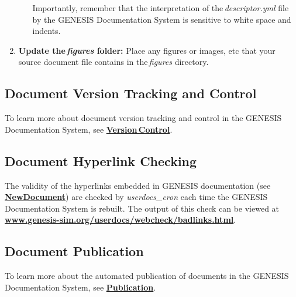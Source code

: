 \documentclass[12pt]{article}
\begin{document}
\begin{enumerate}
\begin{enumerate}
\begin{verbatim}
\end{verbatim}

Importantly, remember that the interpretation of the\,{\it descriptor.yml} file by the GENESIS Documentation System is sensitive to white space and indents.
 
\end{enumerate}

\item {\bf Update the\,{\it figures} folder:} Place any figures or images, etc that your source document file contains in the\,{\it figures} directory.

\end{enumerate}

\subsection*{Document Version Tracking and Control}

To learn more about document version tracking and control in the GENESIS Documentation System, see \href{../version-control/version-control.tex}{\bf Version\,Control}.

\subsection*{Document Hyperlink Checking}

The validity of the hyperlinks embedded in GENESIS documentation (see \href{../NewDocument/NewDocument.tex}{\bf NewDocument}) are checked by {\it userdocs\_cron} each time the GENESIS Documentation System is rebuilt. The output of this check can be viewed at \href{http://www.genesis-sim.org/userdocs/webcheck/badlinks.html}{\bf www.genesis-sim.org/userdocs/webcheck/badlinks.html}.

\subsection*{Document Publication}

To learn more about the automated publication of documents in the GENESIS Documentation System, see \href{../publication/publication.tex}{\bf Publication}.
\end{document}
